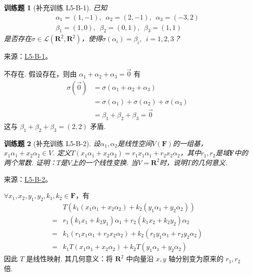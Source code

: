 \documentclass[12pt,fontset=fandol]{ctexart}
\newtheorem{exercise}{训练题}[section]
\begin{document}
\begin{exercise}[补充训练 L5-B-1]\label{prob:L5-B-1}
已知
        \begin{gather*}
            \alpha_1=(1,-1),\enspace\alpha_2=(2,-1),\enspace\alpha_3=(-3,2) \\
            \beta_1=(1,0),\enspace\beta_2=(0,1),\enspace\beta_3=(1,1)
        \end{gather*}
        是否存在$\sigma\in \mathcal{L}(\mathbf{R}^2,\mathbf{R}^2)$，使得$\sigma(\alpha_i)=\beta_i,\enspace i=1,2,3$？
\end{exercise}
\noindent 来源：\href{https://github.com/yhwu-is/Linear-Algebra-Left-Undone/blob/new/%E8%AE%B2%E4%B9%89/%E4%B8%93%E9%A2%98/5%20%E7%BA%BF%E6%80%A7%E6%98%A0%E5%B0%84.tex}{L5-B-1}。
\begin{solve}
不存在. 假设存在，则由 $ \alpha_1 + \alpha_2 + \alpha_3 = \vec{0} $ 有
          \begin{align*}
              \sigma(\vec{0}) & = \sigma(\alpha_1 + \alpha_2 + \alpha_3)                 \\
                              & = \sigma(\alpha_1) + \sigma(\alpha_2) + \sigma(\alpha_3) \\
                              & = \beta_1 + \beta_2 + \beta_3 = \vec{0}
          \end{align*}
          这与 $ \beta_1 + \beta_2 + \beta_3 = (2, 2) $ 矛盾.
\end{solve}

\begin{exercise}[补充训练 L5-B-2]\label{prob:L5-B-2}
设$\alpha_1,\alpha_2$是线性空间$V(\mathbf{F})$的一组基，$x_1\alpha_1+x_2\alpha_2 \in V$. 定义$T(x_1\alpha_1+x_2\alpha_2)=r_1x_1\alpha_1+r_2x_2\alpha_2$，其中$r_1,r_2$是域$\mathbf{F}$中的两个常数. 证明：$T$是$V$上的一个线性变换. 当$V=\mathbf{R}^2$时，说明$T$的几何意义.
\end{exercise}
\noindent 来源：\href{https://github.com/yhwu-is/Linear-Algebra-Left-Undone/blob/new/%E8%AE%B2%E4%B9%89/%E4%B8%93%E9%A2%98/5%20%E7%BA%BF%E6%80%A7%E6%98%A0%E5%B0%84.tex}{L5-B-2}。
\begin{solve}
$ \forall x_1, x_2, y_1, y_2, k_1, k_2 \in \mathbf{F} $，有
          \begin{align*}
                  & T(k_1(x_1 \alpha_1 + x_2 \alpha_2) + k_2(y_1 \alpha_1 + y_2 \alpha_2))                \\
              ={} & r_1(k_1 x_1 + k_2 y_1) \alpha_1 + r_2(k_1 x_2 + k_2 y_2) \alpha_2                     \\
              ={} & k_1 (r_1 x_1 \alpha_1 + r_2 x_2 \alpha_2) + k_2 (r_1 y_1 \alpha_1 + r_2 y_2 \alpha_2) \\
              ={} & k_1 T(x_1 \alpha_1 + x_2 \alpha_2) + k_2 T(y_1 \alpha_1 + y_2 \alpha_2)
          \end{align*}
          因此 $ T $ 是线性映射. 其几何意义：将 $ \mathbf{R}^2 $ 中向量沿 $ x, y $ 轴分别变为原来的 $ r_1, r_2 $ 倍.
\end{solve}
\end{document}
